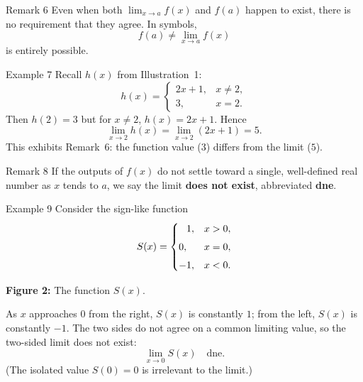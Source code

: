 \begin{remarkbox}{Remark 6}
Even when both \(\displaystyle\lim_{x \to a} f(x)\) and \(f(a)\) happen to exist, there is no requirement that they agree.  In symbols,
\[
f(a) \neq \lim_{x \to a} f(x)
\]
is entirely possible.
\end{remarkbox}

\begin{examplebox}{Example 7}
Recall \(h(x)\) from Illustration~1:
\[
h(x) = \begin{cases}
2x + 1, & x \neq 2, \\[4pt]
3,      & x = 2.
\end{cases}
\]
Then \(h(2) = 3\) but for \(x \neq 2\), \(h(x) = 2x + 1\).  Hence
\[
\lim_{x \to 2} h(x) = \lim_{x \to 2} (2x + 1) = 5.
\]
This exhibits Remark~6: the function value (\(3\)) differs from the limit (\(5\)).
\end{examplebox}

\begin{remarkbox}{Remark 8}
If the outputs of \(f(x)\) do not settle toward a single, well-defined real number as \(x\) tends to \(a\), we say the limit \textbf{does not exist}, abbreviated \textbf{dne}.
\end{remarkbox}

\begin{examplebox}{Example 9}
Consider the sign-like function
\[
S(x) = \begin{cases}
\hphantom{-}1, & x > 0, \\[4pt]
           0,  & x = 0, \\[4pt]
          -1,  & x < 0.
\end{cases}
\]

\begin{center}

\smallskip
\textbf{Figure 2:} The function \(S(x)\).
\end{center}

As \(x\) approaches \(0\) from the right, \(S(x)\) is constantly \(1\); from the left, \(S(x)\) is constantly \(-1\).  The two sides do not agree on a common limiting value, so the two-sided limit does not exist:
\[
\lim_{x \to 0} S(x) \quad \text{dne}.
\]
(The isolated value \(S(0) = 0\) is irrelevant to the limit.)
\end{examplebox}



